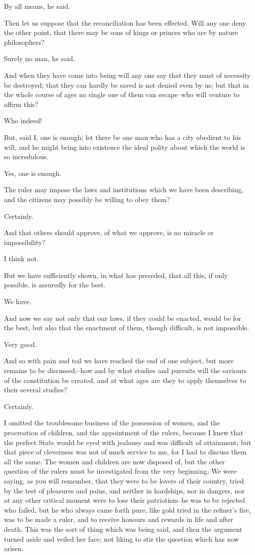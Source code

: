 By all means, he said.

Then let us suppose that the reconciliation has been effected. Will any
one deny the other point, that there may be sons of kings or princes who
are by nature philosophers?

Surely no man, he said.

And when they have come into being will any one say that they must of
necessity be destroyed; that they can hardly be saved is not denied even
by us; but that in the whole course of ages no single one of them can
escape--who will venture to affirm this?

Who indeed!

But, said I, one is enough; let there be one man who has a city obedient
to his will, and he might bring into existence the ideal polity about
which the world is so incredulous.

Yes, one is enough.

The ruler may impose the laws and institutions which we have been
describing, and the citizens may possibly be willing to obey them?

Certainly.

And that others should approve, of what we approve, is no miracle or
impossibility?

I think not.

But we have sufficiently shown, in what has preceded, that all this, if
only possible, is assuredly for the best.

We have.

And now we say not only that our laws, if they could be enacted, would
be for the best, but also that the enactment of them, though difficult,
is not impossible.

Very good.

And so with pain and toil we have reached the end of one subject, but
more remains to be discussed;--how and by what studies and pursuits will
the saviours of the constitution be created, and at what ages are they
to apply themselves to their several studies?

Certainly.

I omitted the troublesome business of the possession of women, and the
procreation of children, and the appointment of the rulers, because
I knew that the perfect State would be eyed with jealousy and was
difficult of attainment; but that piece of cleverness was not of much
service to me, for I had to discuss them all the same. The women and
children are now disposed of, but the other question of the rulers must
be investigated from the very beginning. We were saying, as you will
remember, that they were to be lovers of their country, tried by the
test of pleasures and pains, and neither in hardships, nor in dangers,
nor at any other critical moment were to lose their patriotism--he was
to be rejected who failed, but he who always came forth pure, like gold
tried in the refiner's fire, was to be made a ruler, and to receive
honours and rewards in life and after death. This was the sort of thing
which was being said, and then the argument turned aside and veiled her
face; not liking to stir the question which has now arisen.

